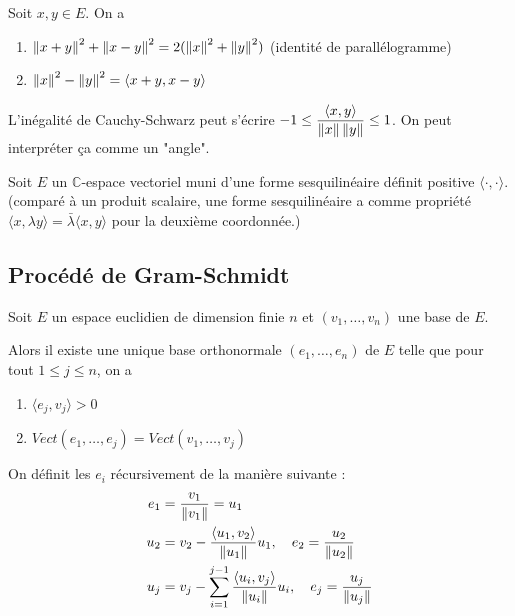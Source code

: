 \documentclass[a4paper, 12pt]{article}
\begin{document}
\begin{theoreme}{}{}
    Soit $x, y \in E$. On a
    \begin{enumerate}
        \item $\left\lVert x + y\right\rVert^2 + \left\lVert x - y\right\rVert^2 = 2(\left\lVert x\right\rVert^2 + \left\lVert y\right\rVert^2)$ (identité de parallélogramme)
        \item $\left\lVert x\right\rVert^2 - \left\lVert y\right\rVert^2 = \langle x + y, x - y \rangle$
    \end{enumerate}
\end{theoreme}

\begin{remarque}
    L'inégalité de Cauchy-Schwarz peut s'écrire $-1 \leq \dfrac{\langle x, y \rangle}{\left\lVert x\right\rVert \left\lVert y\right\rVert} \leq 1$.
    On peut interpréter ça comme un "angle".
\end{remarque}

\begin{remarque}
    Soit $E$ un $\mathbb{C}$-espace vectoriel muni d'une forme sesquilinéaire définit positive $\langle \cdot, \cdot \rangle$.
    (comparé à un produit scalaire, une forme sesquilinéaire a comme propriété $\langle x, \lambda y \rangle = \bar{\lambda} \langle x, y \rangle$ pour la deuxième coordonnée.)
\end{remarque}

\subsection{Procédé de Gram-Schmidt}

\begin{theoreme}{}{}
    Soit $E$ un espace euclidien de dimension finie $n$ et $(v_1, \dots, v_n)$ une base de $E$.

    Alors il existe une unique base orthonormale $(e_1, \dots, e_n)$ de $E$ telle que pour tout $1 \leq j \leq n$, on a
    \begin{enumerate}
        \item $\langle e_j, v_j \rangle > 0$
        \item $Vect(e_1, \dots, e_j) = Vect(v_1, \dots, v_j)$
    \end{enumerate}
\end{theoreme}

\begin{demonstration}
    On définit les $e_i$ récursivement de la manière suivante :
\begin{align*}
    e_1 &= \frac{v_1}{\left\lVert v_1\right\rVert} = u_1 \\
    u_2 &= v_2 - \dfrac{\langle u_1, v_2 \rangle}{\left\lVert u_1\right\rVert} u_1, \quad e_2 = \frac{u_2}{\left\lVert u_2\right\rVert} \\
    u_j &= v_j - \sum_{i=1}^{j-1} \dfrac{\langle u_i, v_j \rangle}{\left\lVert u_i\right\rVert} u_i, \quad e_j = \frac{u_j}{\left\lVert u_j\right\rVert}
\end{align*}
\end{demonstration}
\end{document}
